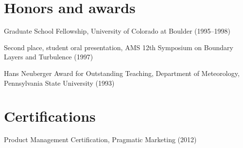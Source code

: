 \documentclass[letterpaper]{resume}
\begin{document}

\section{Honors and awards}

\vspace{1.0em}
\begin{compactitem}[\itembullet]
  \item Graduate School Fellowship, University of Colorado
    at Boulder (1995--1998)
  \item Second place, student oral presentation, AMS 12th
    Symposium on Boundary Layers and Turbulence (1997)
  \item Hans Neuberger Award for Outstanding Teaching,
    Department of Meteorology, Pennsylvania State University (1993)
\end{compactitem}


\section{Certifications}

\vspace{1.0em}
\begin{compactitem}[\itembullet]
  \item Product Management Certification, Pragmatic Marketing (2012)
\end{compactitem}

\end{document}
